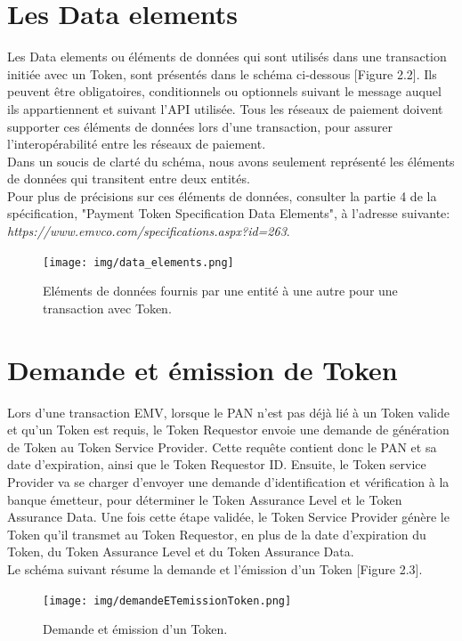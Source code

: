 \documentclass{report}
\begin{document}
\section{Les Data elements}
Les Data elements ou éléments de données qui sont utilisés dans une transaction initiée avec un Token, sont présentés dans le schéma ci-dessous [Figure 2.2]. Ils peuvent être obligatoires, conditionnels ou optionnels suivant le message auquel ils appartiennent et suivant l'API utilisée. Tous les réseaux de paiement doivent supporter ces éléments de données lors d'une transaction, pour assurer l'interopérabilité entre les réseaux de paiement.\\

\noindent
Dans un soucis de clarté du schéma, nous avons seulement représenté les éléments de données qui transitent entre deux entités.\\
Pour plus de précisions sur ces éléments de données, consulter la partie 4 de la spécification, "Payment Token Specification Data Elements", à l'adresse suivante: \textit{https://www.emvco.com/specifications.aspx?id=263}.

\begin{figure}[!ht]
    \centering
			\texttt{[image: img/data\_elements.png]}
			\caption{\label{DataElements} Eléments de données fournis par une entité à une autre pour une transaction avec Token.}			
\end{figure}


\section{Demande et émission de Token}
Lors d'une transaction EMV, lorsque le PAN n'est pas déjà lié à un Token valide et qu'un Token est requis, le Token Requestor envoie une demande de génération de Token au Token Service Provider. Cette requête contient donc le PAN et sa date d'expiration, ainsi que le Token Requestor ID. Ensuite, le Token service Provider va se charger d'envoyer une demande d'identification et vérification à la banque émetteur, pour déterminer le Token Assurance Level et le Token Assurance Data. Une fois cette étape validée, le Token Service Provider génère le Token qu'il transmet au Token Requestor, en plus de la date d'expiration du Token, du Token Assurance Level et du Token Assurance Data.\\

\noindent
Le schéma suivant résume la demande et l'émission d'un Token [Figure 2.3].

\begin{figure}[!ht]
    \centering
			\texttt{[image: img/demandeETemissionToken.png]}
			\caption{\label{DemandeEmissionToken} Demande et émission d'un Token.}			
\end{figure}
\end{document}
